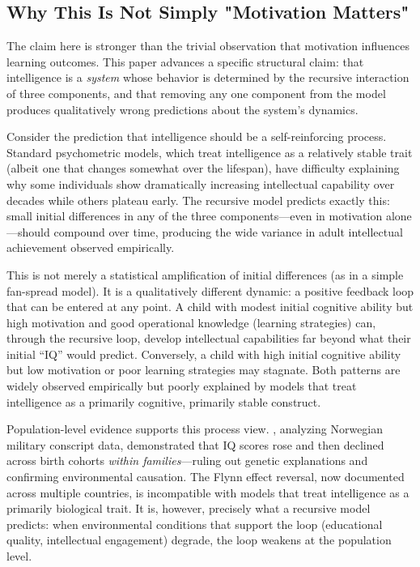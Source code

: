 \documentclass[12pt,a4paper]{article}
\begin{document}
\subsection{Why This Is Not Simply "Motivation Matters"}

The claim here is stronger than the trivial observation that motivation influences learning outcomes. This paper advances a specific structural claim: that intelligence is a \emph{system} whose behavior is determined by the recursive interaction of three components, and that removing any one component from the model produces qualitatively wrong predictions about the system's dynamics.

Consider the prediction that intelligence should be a self-reinforcing process. Standard psychometric models, which treat intelligence as a relatively stable trait (albeit one that changes somewhat over the lifespan), have difficulty explaining why some individuals show dramatically increasing intellectual capability over decades while others plateau early. The recursive model predicts exactly this: small initial differences in any of the three components---\hspace{0pt}even in motivation alone---\hspace{0pt}should compound over time, producing the wide variance in adult intellectual achievement observed empirically.

This is not merely a statistical amplification of initial differences (as in a simple fan-spread model). It is a qualitatively different dynamic: a positive feedback loop that can be entered at any point. A child with modest initial cognitive ability but high motivation and good operational knowledge (learning strategies) can, through the recursive loop, develop intellectual capabilities far beyond what their initial ``IQ'' would predict. Conversely, a child with high initial cognitive ability but low motivation or poor learning strategies may stagnate. Both patterns are widely observed empirically but poorly explained by models that treat intelligence as a primarily cognitive, primarily stable construct.

Population-level evidence supports this process view. \citet{BratsbergandRogeberg2018}, analyzing Norwegian military conscript data, demonstrated that IQ scores rose and then declined across birth cohorts \emph{within families}---\hspace{0pt}ruling out genetic explanations and confirming environmental causation. The Flynn effect reversal, now documented across multiple countries, is incompatible with models that treat intelligence as a primarily biological trait. It is, however, precisely what a recursive model predicts: when environmental conditions that support the loop (educational quality, intellectual engagement) degrade, the loop weakens at the population level.
\end{document}
